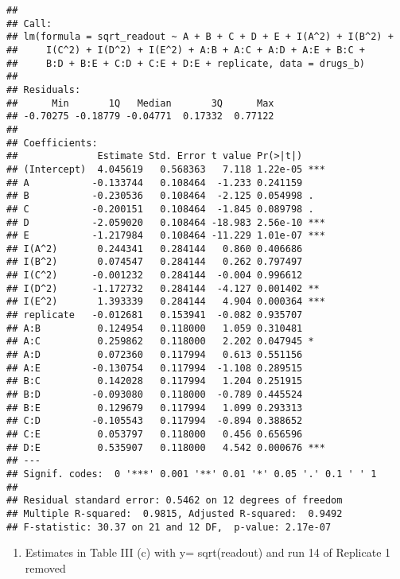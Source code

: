 \documentclass[
]{article}
\providecommand{\tightlist}{%
  \setlength{\itemsep}{0pt}\setlength{\parskip}{0pt}}
\begin{document}
\begin{verbatim}
## 
## Call:
## lm(formula = sqrt_readout ~ A + B + C + D + E + I(A^2) + I(B^2) + 
##     I(C^2) + I(D^2) + I(E^2) + A:B + A:C + A:D + A:E + B:C + 
##     B:D + B:E + C:D + C:E + D:E + replicate, data = drugs_b)
## 
## Residuals:
##      Min       1Q   Median       3Q      Max 
## -0.70275 -0.18779 -0.04771  0.17332  0.77122 
## 
## Coefficients:
##              Estimate Std. Error t value Pr(>|t|)    
## (Intercept)  4.045619   0.568363   7.118 1.22e-05 ***
## A           -0.133744   0.108464  -1.233 0.241159    
## B           -0.230536   0.108464  -2.125 0.054998 .  
## C           -0.200151   0.108464  -1.845 0.089798 .  
## D           -2.059020   0.108464 -18.983 2.56e-10 ***
## E           -1.217984   0.108464 -11.229 1.01e-07 ***
## I(A^2)       0.244341   0.284144   0.860 0.406686    
## I(B^2)       0.074547   0.284144   0.262 0.797497    
## I(C^2)      -0.001232   0.284144  -0.004 0.996612    
## I(D^2)      -1.172732   0.284144  -4.127 0.001402 ** 
## I(E^2)       1.393339   0.284144   4.904 0.000364 ***
## replicate   -0.012681   0.153941  -0.082 0.935707    
## A:B          0.124954   0.118000   1.059 0.310481    
## A:C          0.259862   0.118000   2.202 0.047945 *  
## A:D          0.072360   0.117994   0.613 0.551156    
## A:E         -0.130754   0.117994  -1.108 0.289515    
## B:C          0.142028   0.117994   1.204 0.251915    
## B:D         -0.093080   0.118000  -0.789 0.445524    
## B:E          0.129679   0.117994   1.099 0.293313    
## C:D         -0.105543   0.117994  -0.894 0.388652    
## C:E          0.053797   0.118000   0.456 0.656596    
## D:E          0.535907   0.118000   4.542 0.000676 ***
## ---
## Signif. codes:  0 '***' 0.001 '**' 0.01 '*' 0.05 '.' 0.1 ' ' 1
## 
## Residual standard error: 0.5462 on 12 degrees of freedom
## Multiple R-squared:  0.9815, Adjusted R-squared:  0.9492 
## F-statistic: 30.37 on 21 and 12 DF,  p-value: 2.17e-07
\end{verbatim}

\begin{enumerate}
\def\labelenumi{\Roman{enumi}.}
\setcounter{enumi}{2}
\tightlist
\item
  Estimates in Table III (c) with y= sqrt(readout) and run 14 of
  Replicate 1 removed
\end{enumerate}
\end{document}
